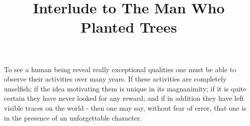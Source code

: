 \documentclass[12pt, a4paper]{article}
\title{\vspace{-6ex} Interlude to The Man Who Planted Trees \cite{the_man_who_planted_trees}}
\date{\vspace{-8ex}}
\begin{document}
\maketitle

To see a human being reveal really exceptional qualities one must be able to observe their activities over many years.
If these activities are completely unselfish;
if the idea motivating them is unique in its magnanimity;
if it is quite certain they have never looked for any reward;
and if in addition they have left visible traces on the world -
then one may say, without fear of error, that one is in the presence of an unforgettable character.

\clearpage


\end{document}
